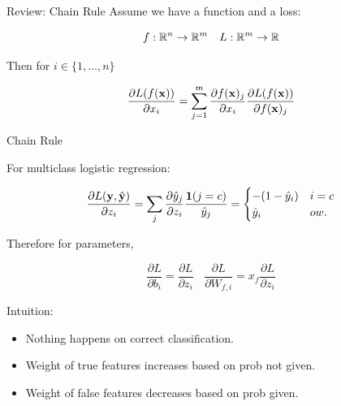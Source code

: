 \documentclass{beamer}
\begin{document}
\begin{frame}{Review: Chain Rule}
  Assume we have a function and a loss:

  \[ f : \reals^n \rightarrow \reals^m \ \ \  L : \reals^m \rightarrow \reals \] 

  Then for $i \in \{1, \ldots, n \}$

  \[ \frac{\partial L(f(\mathbf{x}))}{\partial x_i} = \sum_{j =1}^m \frac{\partial f(\mathbf{x})_j} {\partial  x_i} \frac{\partial L(f(\mathbf{x}))} {\partial f(\mathbf{x})_j}   \]

  
\end{frame}

\begin{frame}{Chain Rule}
  
  For multiclass logistic regression:
  
  \[ \frac{\partial L(\mathbf{y}, \hat{\mathbf{y}})}{\partial z_i} = \sum_{j} \frac{\partial \hat{y}_j }{\partial z_i}  \frac{\mathbf{1}(j = c)} {\hat{y}_j} =     \begin{cases}
      -(1 - \hat{y}_i) & i = c\\
      \hat{y}_i & ow. \\
    \end{cases} \] 

  Therefore for parameters, 

  \[\frac{\partial L}{\partial b_{i}} = 
    \frac{\partial L}{\partial z_{i}} \ \ \ \ \frac{\partial L}{\partial W_{f, i}} = 
     x_f \frac{\partial L}{\partial z_{i}}\]

   \pause
   Intuition:
   \begin{itemize}
   \item Nothing happens on correct classification.
   \item Weight of true features increases based on prob not given.
   \item Weight of false features decreases based on prob given.
   \end{itemize}
\end{frame}
\end{document}
